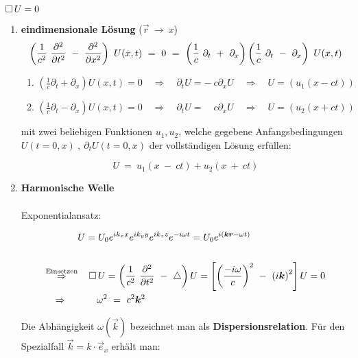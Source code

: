 $\mathop{{}\Box}\nolimits U = 0$

\begin{enumerate}[label=\textbf{\arabic* .}]
	\item \textbf{eindimensionale Lösung} ($\vec{r}\  \rightarrow \ x$)
	\begin{equation*}
	\left(\frac{1}{c^2} \ \pddiff{}{t} \ - \ \pddiff{}{x}\right)\ U(x,t) \ = \ 0 \ = \ \left(\frac{1}{c}\ \partial_t \ + \ \partial_x\right)\left(\frac{1}{c} \ \partial_t \ - \ \partial_x\right) \ U(x,t)
	\end{equation*}
	
	\begin{enumerate}
		\item $\left(\frac{1}{c}\partial_t+\partial_x\right)U(x,t) = 0 \quad\Rightarrow\quad \partial_t U = - \ c \partial_x U \quad\Rightarrow\quad U = (u_1(x-ct))$
		\item $\left(\frac{1}{c}\partial_t-\partial_x\right)U(x,t) = 0 \quad\Rightarrow\quad \partial_t U =\quad c \partial_x U \quad\Rightarrow\quad U = (u_2(x+ct))$
	\end{enumerate}
	
	mit zwei beliebigen Funktionen $u_1,u_2$, welche gegebene Anfangsbedingungen $U(t=0,x) \ , \ \partial_t U(t=0,x)$ der vollständigen Lösung erfüllen:
	
	\begin{equation*}
	U \ = \ u_1(x\ -\ ct) + u_2(x\ +\ ct)
	\end{equation*}
	
	\item
	\textbf{Harmonische Welle}\\
	\ \\
	Exponentialansatz:
	
	\begin{align*}
	& U=U_0 e^{ik_x x}e^{ik_y y}e^{ik_z z}e^{-i\omega t} = U_0 e^{i(\vec{k}\vec{r}-\omega
		t)}\\
	\ \\
	\overset{\text{Einsetzen}}{\Rightarrow} &\quad\Dalembert U = \left(\frac{1}{c^2} \ \pddiff{}{t} \ - \ \laplace\right)U = \left[\left(\frac{-i\omega}{c}\right)^2 \ - \ \left(i\vec{k}\right)^2\right]U = 0\\
	\Rightarrow \ \quad&\qquad \omega^2 \ = \ c^2 \vec{k}^2
	\end{align*}
	
	Die Abhängigkeit $\omega(\vec{k})$ bezeichnet man als \textbf{Dispersionsrelation}. Für den Spezialfall $\vec{k} = k \cdot \vec{e}_x$ erhält man:
	

\end{enumerate}

